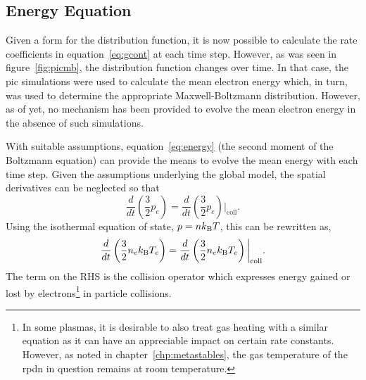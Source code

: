 \subsection{Energy Equation}

Given a form for the distribution function, it is now possible to calculate the
rate coefficients in equation~\ref{eq:gcont} at each time step. However, as was
seen in figure~\ref{fig:picmb}, the distribution function changes over time. In
that case, the \acs{pic} simulations were used to calculate the mean electron
energy which, in turn, was used to determine the appropriate Maxwell-Boltzmann
distribution. However, as of yet, no mechanism has been provided to evolve the
mean electron energy in the absence of such simulations.

With suitable assumptions, equation~\ref{eq:energy} (the second moment of the
Boltzmann equation) can provide the means to evolve the mean energy with each
time step. Given the assumptions underlying the global model, the spatial
derivatives can be neglected so that
\begin{equation}
  \frac{d}{dt}\left(\frac{3}{2}p_e\right) =
  \frac{d}{dt}\left(\frac{3}{2}p_e\right)\bigg|_\mathrm{coll}.
\end{equation}
Using the isothermal equation of state, $p=nk_\mathrm{B} T$, this can be rewritten as,
\begin{equation}
  \frac{d}{dt}\left(\frac{3}{2}n_ek_\mathrm{B} T_e \right) =
  \frac{d}{dt}\left(\frac{3}{2}n_ek_\mathrm{B} T_e \right)\bigg|_\mathrm{coll}.
  \label{eq:energy2}
\end{equation}
The term on the RHS is the collision operator which expresses energy gained or
lost by electrons\footnote{In some plasmas, it is desirable to also treat gas
heating with a similar equation as it can have an appreciable impact on certain
rate constants. However, as noted in chapter~\ref{chp:metastables}, the gas
temperature of the \acs{rpdn} in question remains at room temperature.} in
particle collisions.

